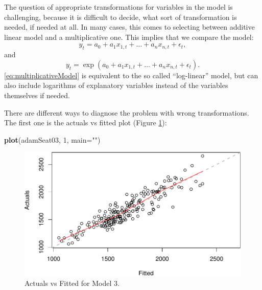 \documentclass[]{book}
\newenvironment{Shaded}{\begin{snugshade}}{\end{snugshade}}
\newcommand{\DataTypeTok}[1]{\textcolor[rgb]{0.13,0.29,0.53}{#1}}
\newcommand{\DecValTok}[1]{\textcolor[rgb]{0.00,0.00,0.81}{#1}}
\newcommand{\KeywordTok}[1]{\textcolor[rgb]{0.13,0.29,0.53}{\textbf{#1}}}
\newcommand{\NormalTok}[1]{#1}
\newcommand{\StringTok}[1]{\textcolor[rgb]{0.31,0.60,0.02}{#1}}
\theoremstyle{definition}
\theoremstyle{definition}
\theoremstyle{definition}
\theoremstyle{definition}
\theoremstyle{remark}
\begin{document}
The question of appropriate transformations for variables in the model is challenging, because it is difficult to decide, what sort of transformation is needed, if needed at all. In many cases, this comes to selecting between additive linear model and a multiplicative one. This implies that we compare the model:
\begin{equation}
    y_t = a_0 + a_1 x_{1,t} + \dots + a_n x_{n,t} + \epsilon_t,
    \label{eq:additiveModel}
\end{equation}
and
\begin{equation}
    y_t = \exp\left(a_0 + a_1 x_{1,t} + \dots + a_n x_{n,t} + \epsilon_t\right) .
    \label{eq:multiplicativeModel}
\end{equation}
\eqref{eq:multiplicativeModel} is equivalent to the so called ``log-linear'' model, but can also include logarithms of explanatory variables instead of the variables themselves if needed.

There are different ways to diagnose the problem with wrong transformations. The first one is the actuals vs fitted plot (Figure \ref{fig:adamSeat03ActualsFitted}):

\begin{Shaded}
\begin{Highlighting}[]
\KeywordTok{plot}\NormalTok{(adamSeat03, }\DecValTok{1}\NormalTok{, }\DataTypeTok{main=}\StringTok{""}\NormalTok{)}
\end{Highlighting}
\end{Shaded}

\begin{figure}
\centering
\includegraphics{Svetunkov--2022----ADAM_files/figure-latex/adamSeat03ActualsFitted-1.pdf}
\caption{\label{fig:adamSeat03ActualsFitted}Actuals vs Fitted for Model 3.}
\end{figure}
\end{document}

